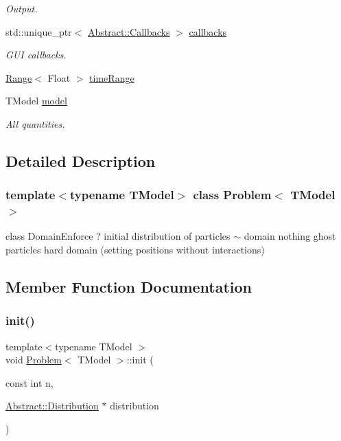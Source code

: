 \begin{DoxyCompactItemize}
\begin{DoxyCompactList}\small\item\em Output. \end{DoxyCompactList}\item 
\hypertarget{classProblem_a9eb29a52f06b59e9cf018eb6f8c599ad}{}\label{classProblem_a9eb29a52f06b59e9cf018eb6f8c599ad} 
std\+::unique\+\_\+ptr$<$ \hyperlink{classAbstract_1_1Callbacks}{Abstract\+::\+Callbacks} $>$ \hyperlink{classProblem_a9eb29a52f06b59e9cf018eb6f8c599ad}{callbacks}
\begin{DoxyCompactList}\small\item\em G\+UI callbacks. \end{DoxyCompactList}\item 
\hyperlink{classRange}{Range}$<$ Float $>$ \hyperlink{classProblem_ac375fb4749fa6006cdf4705b238deed9}{time\+Range}
\item 
\hypertarget{classProblem_aaac5f756bcaf526e53d640c6d37d01ce}{}\label{classProblem_aaac5f756bcaf526e53d640c6d37d01ce} 
T\+Model \hyperlink{classProblem_aaac5f756bcaf526e53d640c6d37d01ce}{model}
\begin{DoxyCompactList}\small\item\em All quantities. \end{DoxyCompactList}\end{DoxyCompactItemize}


\subsection{Detailed Description}
\subsubsection*{template$<$typename T\+Model$>$\newline
class Problem$<$ T\+Model $>$}

class Domain\+Enforce ? initial distribution of particles $\sim$ domain nothing ghost particles hard domain (setting positions without interactions) 

\subsection{Member Function Documentation}
\hypertarget{classProblem_a27fca73edfbe372285fefc86f56d2718}{}\label{classProblem_a27fca73edfbe372285fefc86f56d2718} 
\subsubsection{\texorpdfstring{init()}{init()}}
{\footnotesize\ttfamily template$<$typename T\+Model $>$ \\
void \hyperlink{classProblem}{Problem}$<$ T\+Model $>$\+::init (\begin{DoxyParamCaption}\item[{const int}]{n,  }\item[{\hyperlink{classAbstract_1_1Distribution}{Abstract\+::\+Distribution} $\ast$}]{distribution }\end{DoxyParamCaption})\hspace{0.3cm}{\ttfamily [inline]}}


